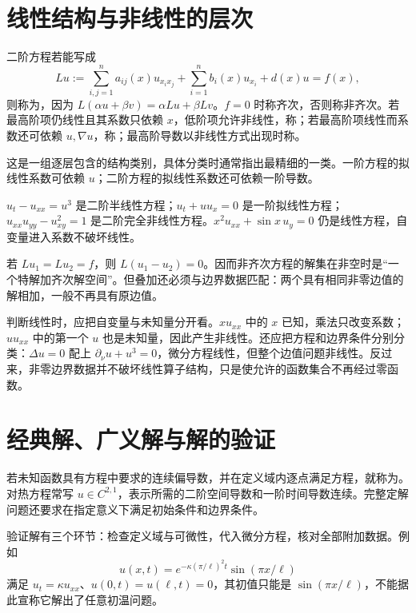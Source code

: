\documentclass[UTF8,12pt,a4paper,fontset=fandol]{ctexbook}
\begin{document}
\section{线性结构与非线性的层次}
\begin{definition}
二阶方程若能写成
\[
 Lu:=\sum_{i,j=1}^n a_{ij}(x)u_{x_ix_j}
       +\sum_{i=1}^n b_i(x)u_{x_i}+d(x)u=f(x),
\]
则称为，因为 $L(\alpha u+\beta v)=\alpha Lu+\beta Lv$。$f=0$ 时称齐次，否则称非齐次。若最高阶项仍线性且其系数只依赖 $x$，低阶项允许非线性，称；若最高阶项线性而系数还可依赖 $u,\nabla u$，称；最高阶导数以非线性方式出现时称。
\end{definition}
这是一组逐层包含的结构类别，具体分类时通常指出最精细的一类。一阶方程的拟线性系数可依赖 $u$；二阶方程的拟线性系数还可依赖一阶导数。

\begin{example}
$u_t-u_{xx}=u^3$ 是二阶半线性方程；$u_t+u u_x=0$ 是一阶拟线性方程；$u_{xx}u_{yy}-u_{xy}^2=1$ 是二阶完全非线性方程。$x^2u_{xx}+\sin x\,u_y=0$ 仍是线性方程，自变量进入系数不破坏线性。
\end{example}
若 $Lu_1=Lu_2=f$，则 $L(u_1-u_2)=0$。因而非齐次方程的解集在非空时是“一个特解加齐次解空间”。但叠加还必须与边界数据匹配：两个具有相同非零边值的解相加，一般不再具有原边值。

判断线性时，应把自变量与未知量分开看。$x u_{xx}$ 中的 $x$ 已知，乘法只改变系数；$u u_{xx}$ 中的第一个 $u$ 也是未知量，因此产生非线性。还应把方程和边界条件分别分类：$\Delta u=0$ 配上 $\partial_\nu u+u^3=0$，微分方程线性，但整个边值问题非线性。反过来，非零边界数据并不破坏线性算子结构，只是使允许的函数集合不再经过零函数。

\section{经典解、广义解与解的验证}
\begin{definition}
若未知函数具有方程中要求的连续偏导数，并在定义域内逐点满足方程，就称为。对热方程常写 $u\in C^{2,1}$，表示所需的二阶空间导数和一阶时间导数连续。完整定解问题还要求在指定意义下满足初始条件和边界条件。
\end{definition}
验证解有三个环节：检查定义域与可微性，代入微分方程，核对全部附加数据。例如
\[
 u(x,t)=e^{-\kappa(\pi/\ell)^2t}\sin(\pi x/\ell)
\]
满足 $u_t=\kappa u_{xx}$、$u(0,t)=u(\ell,t)=0$，其初值只能是 $\sin(\pi x/\ell)$，不能据此宣称它解出了任意初温问题。
\end{document}

